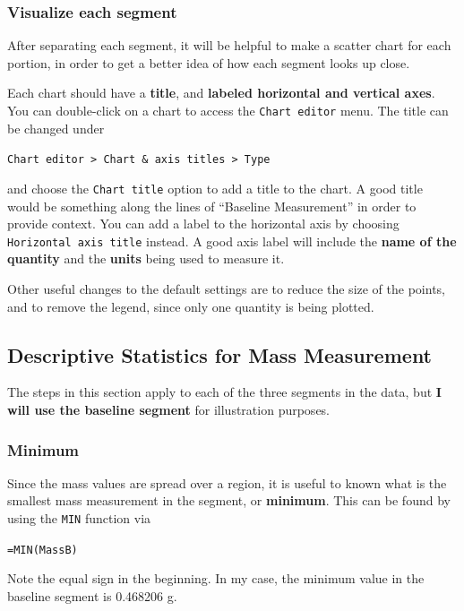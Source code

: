 \subsubsection{Visualize each segment}
After separating each segment, it will be helpful to make a scatter chart for each portion, in order to get a better idea of how each segment looks up close.

Each chart should have a \textbf{title}, and \textbf{labeled horizontal and vertical axes}. You can double-click on a chart to access the \texttt{Chart editor} menu. The title can be changed under
\begin{center}
    \texttt{Chart editor > Chart \& axis titles > Type}
\end{center}
and choose the \texttt{Chart title} option to add a title to the chart. A good title would be something along the lines of ``Baseline Measurement'' in order to provide context. You can add a label to the horizontal axis by choosing \texttt{Horizontal axis title} instead. A good axis label will include the \textbf{name of the quantity} and the \textbf{units} being used to measure it.

Other useful changes to the default settings are to reduce the size of the points, and to remove the legend, since only one quantity is being plotted.
\subsection{Descriptive Statistics for Mass Measurement}
The steps in this section apply to each of the three segments in the data, but \textbf{I will use the baseline segment} for illustration purposes.
\subsubsection{Minimum}
Since the mass values are spread over a region, it is useful to known what is the smallest mass measurement in the segment, or \textbf{minimum}. This can be found by using the \texttt{MIN} function via
\begin{center}
    \texttt{=MIN(MassB)}
\end{center}
Note the equal sign in the beginning. In my case, the minimum value in the baseline segment is 0.468206 g.
